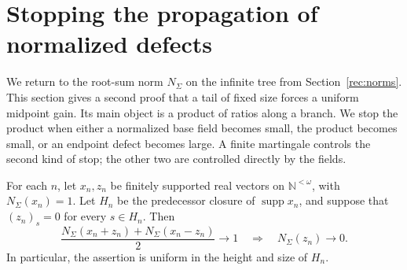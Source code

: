 \section{Stopping the propagation of normalized defects}\label{stop:section}\label{rec:martingale}

We return to the root-sum norm $N_\Sigma$ on the infinite tree from
Section~\ref{rec:norms}.  This section gives a second proof that a tail
of fixed size forces a uniform midpoint gain.  Its main object is a
product of ratios along a branch.  We stop the product when either a
normalized base field becomes small, the product becomes small, or an endpoint
defect becomes large.  A finite martingale controls the second kind of
stop; the other two are controlled directly by the fields.

\begin{lemma}\label{stop:sequential}
For each $n$, let $x_n,z_n$ be finitely supported real vectors on
$\mathbb N^{<\omega}$, with $N_\Sigma(x_n)=1$.  Let $H_n$ be the
predecessor closure of $\operatorname{supp}x_n$, and suppose that
$(z_n)_s=0$ for every $s\in H_n$.  Then
\[
 \frac{N_\Sigma(x_n+z_n)+N_\Sigma(x_n-z_n)}2\longrightarrow1
 \quad\Longrightarrow\quad N_\Sigma(z_n)\longrightarrow0.
\]
In particular, the assertion is uniform in the height and size of $H_n$.
\end{lemma}


